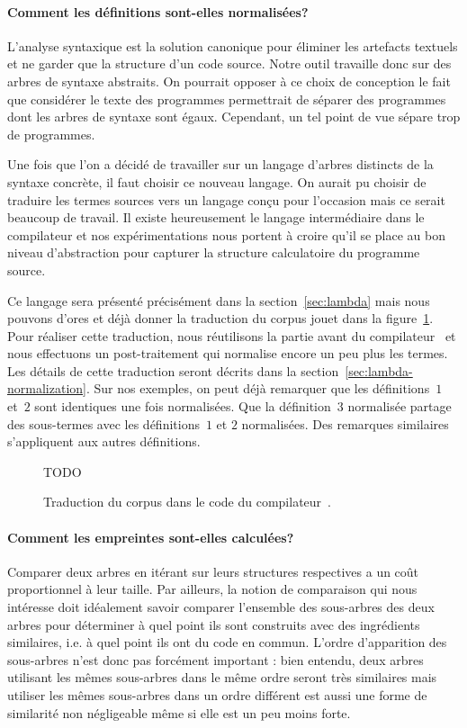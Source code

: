 \paragraph{Comment les définitions sont-elles normalisées?}
L'analyse syntaxique est la solution canonique pour éliminer les
artefacts textuels et ne garder que la structure d'un code source.
Notre outil travaille donc sur des arbres de syntaxe abstraits.  On
pourrait opposer à ce choix de conception le fait que considérer le
texte des programmes permettrait de séparer des programmes dont les
arbres de syntaxe sont égaux. Cependant, un tel point de vue sépare
trop de programmes.

Une fois que l'on a décidé de travailler sur un langage d'arbres
distincts de la syntaxe concrète, il faut choisir ce nouveau langage.
On aurait pu choisir de traduire les termes sources vers un langage
conçu pour l'occasion mais ce serait beaucoup de travail. Il existe
heureusement le langage intermédiaire {\LambdaCode} dans le
compilateur et nos expérimentations nous portent à croire qu'il se
place au bon niveau d'abstraction pour capturer la structure
calculatoire du programme source.

Ce langage sera présenté précisément dans la section~\ref{sec:lambda}
mais nous pouvons d'ores et déjà donner la traduction du corpus jouet
dans la figure~\ref{fig:lambda-corpus}. Pour réaliser cette
traduction, nous réutilisons la partie avant du compilateur~{\OCaml}
et nous effectuons un post-traitement qui normalise encore un peu plus
les termes. Les détails de cette traduction seront décrits dans la
section~\ref{sec:lambda-normalization}. Sur nos exemples, on peut déjà
remarquer que les définitions~$1$ et~$2$ sont identiques une fois
normalisées. Que la définition~$3$ normalisée partage des sous-termes
avec les définitions~$1$ et $2$ normalisées. Des remarques similaires
s'appliquent aux autres définitions.

\begin{figure}

TODO

\caption{Traduction du corpus dans le code {\LambdaCode} du compilateur~\OCaml.}
\label{fig:lambda-corpus}
\end{figure}

\paragraph{Comment les empreintes sont-elles calculées?}

Comparer deux arbres en itérant sur leurs structures respectives a un
coût proportionnel à leur taille. Par ailleurs, la notion de
comparaison qui nous intéresse doit idéalement savoir comparer
l'ensemble des sous-arbres des deux arbres pour déterminer à quel
point ils sont construits avec des ingrédients similaires, i.e.  à
quel point ils ont du code en commun. L'ordre d'apparition des
sous-arbres n'est donc pas forcément important : bien entendu, deux
arbres utilisant les mêmes sous-arbres dans le même ordre seront
très similaires mais utiliser les mêmes sous-arbres dans un ordre
différent est aussi une forme de similarité non négligeable même
si elle est un peu moins forte.

